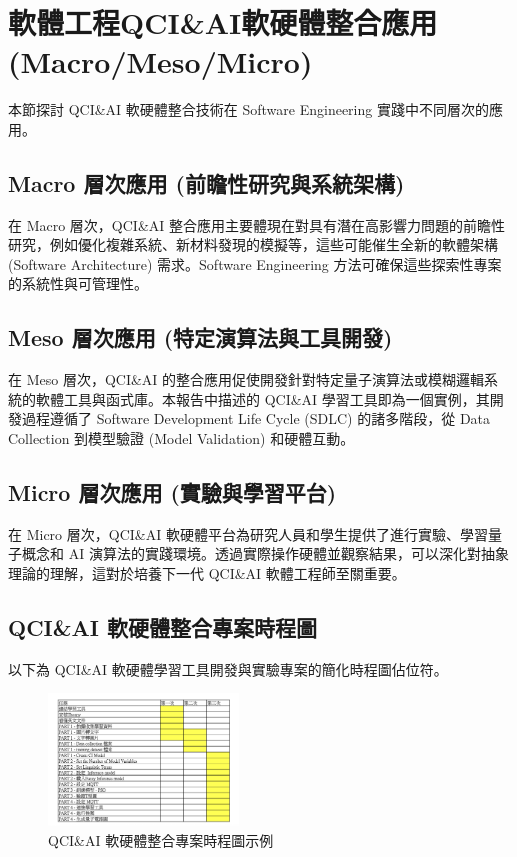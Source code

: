 \documentclass[twocolumn,11pt,a4paper]{article}
\begin{document}
\section{軟體工程QCI\&AI軟硬體整合應用(Macro/Meso/Micro)}
本節探討 QCI\&AI 軟硬體整合技術在 Software Engineering 實踐中不同層次的應用。

\subsection{Macro 層次應用 (前瞻性研究與系統架構)}
在 Macro 層次，QCI\&AI 整合應用主要體現在對具有潛在高影響力問題的前瞻性研究，例如優化複雜系統、新材料發現的模擬等，這些可能催生全新的軟體架構 (Software Architecture) 需求。Software Engineering 方法可確保這些探索性專案的系統性與可管理性。

\subsection{Meso 層次應用 (特定演算法與工具開發)}
在 Meso 層次，QCI\&AI 的整合應用促使開發針對特定量子演算法或模糊邏輯系統的軟體工具與函式庫。本報告中描述的 QCI\&AI 學習工具即為一個實例，其開發過程遵循了 Software Development Life Cycle (SDLC) 的諸多階段，從 Data Collection 到模型驗證 (Model Validation) 和硬體互動。

\subsection{Micro 層次應用 (實驗與學習平台)}
在 Micro 層次，QCI\&AI 軟硬體平台為研究人員和學生提供了進行實驗、學習量子概念和 AI 演算法的實踐環境。透過實際操作硬體並觀察結果，可以深化對抽象理論的理解，這對於培養下一代 QCI\&AI 軟體工程師至關重要。

\subsection{QCI\&AI 軟硬體整合專案時程圖}
以下為 QCI\&AI 軟硬體學習工具開發與實驗專案的簡化時程圖佔位符。
\begin{figure}[htbp]
    \centering
    \includegraphics[width=0.45\textwidth]{res/image/QCI_AI_timeline.png} %
    \caption{QCI\&AI 軟硬體整合專案時程圖示例}
    \label{fig:qciai_schedule}
\end{figure}
\FloatBarrier
\end{document}
